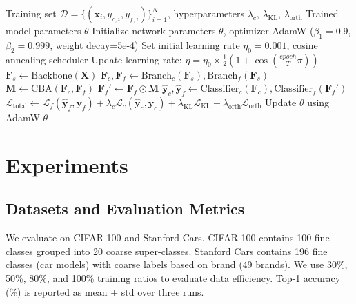 \documentclass[pdflatex,sn-mathphys-num]{sn-jnl}
\theoremstyle{thmstyleone}%
\theoremstyle{thmstyletwo}%
\theoremstyle{thmstylethree}%
\begin{document}
\begin{algorithm}[t]
    \caption{Training procedure of HFENet}
    \label{alg:training}
    \begin{algorithmic}[1]
    \Require Training set $\mathcal{D}=\{(\mathbf{x}_i, y_{c,i}, y_{f,i})\}_{i=1}^N$, hyperparameters $\lambda_c$, $\lambda_{\mathrm{KL}}$, $\lambda_{\mathrm{orth}}$
    \Ensure Trained model parameters $\theta$
    \State Initialize network parameters $\theta$, optimizer AdamW ($\beta_1=0.9$, $\beta_2=0.999$, weight decay=5e-4)
    \State Set initial learning rate $\eta_0 = 0.001$, cosine annealing scheduler
        \State Update learning rate: $\eta = \eta_0 \times \frac{1}{2}\left(1 + \cos\left(\frac{epoch}{T}\pi\right)\right)$
            \State $\mathbf{F}_s \gets \text{Backbone}(\mathbf{X})$
            \State $\mathbf{F}_c, \mathbf{F}_f \gets \text{Branch}_c(\mathbf{F}_s), \text{Branch}_f(\mathbf{F}_s)$
            \State $\mathbf{M} \gets \text{CBA}(\mathbf{F}_c, \mathbf{F}_f)$
            \State $\mathbf{F}_f' \gets \mathbf{F}_f \odot \mathbf{M}$
            \State $\hat{\mathbf{y}}_c, \hat{\mathbf{y}}_f \gets \text{Classifier}_c(\mathbf{F}_c), \text{Classifier}_f(\mathbf{F}_f')$
            \State $\mathcal{L}_{\text{total}} \gets \mathcal{L}_f(\hat{\mathbf{y}}_f, \mathbf{y}_f) + \lambda_c \mathcal{L}_c(\hat{\mathbf{y}}_c, \mathbf{y}_c) + \lambda_{\mathrm{KL}} \mathcal{L}_{\mathrm{KL}} + \lambda_{\mathrm{orth}} \mathcal{L}_{\mathrm{orth}}$
            \State Update $\theta$ using AdamW
        \EndFor
    \EndFor
    \State \Return $\theta$
    \end{algorithmic}
\end{algorithm}

\section{Experiments}
\label{sec:experiments}

\subsection{Datasets and Evaluation Metrics}
We evaluate on CIFAR-100 and Stanford Cars. CIFAR-100 contains 100 fine classes grouped into 20 coarse super-classes. Stanford Cars contains 196 fine classes (car models) with coarse labels based on brand (49 brands). We use 30\%, 50\%, 80\%, and 100\% training ratios to evaluate data efficiency. Top-1 accuracy (\%) is reported as mean $\pm$ std over three runs.
\end{document}
